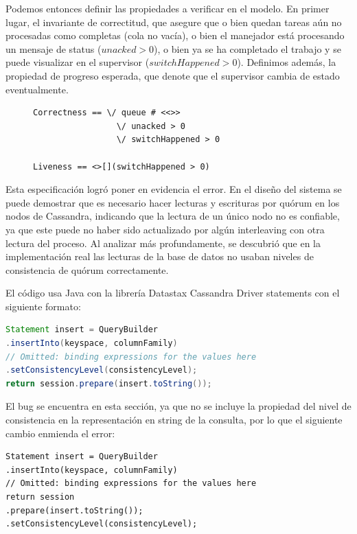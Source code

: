 \documentclass[runningheads]{llncs}
\begin{document}
Podemos entonces definir las propiedades a verificar en el modelo. En primer lugar, el invariante de correctitud, que asegure que o bien quedan tareas aún no procesadas como completas (cola no vacía), o bien el manejador está procesando un mensaje de status (\(unacked > 0\)), o bien ya se ha completado el trabajo y se puede visualizar en el supervisor (\(switchHappened > 0\)). Definimos además, la propiedad de progreso esperada, que denote que el supervisor cambia de estado eventualmente.

\begin{figure}
\begin{lstlisting}
Correctness == \/ queue # <<>>
                 \/ unacked > 0
                 \/ switchHappened > 0    

Liveness == <>[](switchHappened > 0)
\end{lstlisting}
\end{figure}

Esta especificación logró poner en evidencia el error. En el diseño del sistema se puede demostrar que es necesario hacer lecturas y escrituras por quórum en los nodos de Cassandra, indicando que la lectura de un único nodo no es confiable, ya que este puede no haber sido actualizado por algún interleaving con otra lectura del proceso. Al analizar más profundamente, se descubrió que en la implementación real las lecturas de la base de datos no usaban niveles de consistencia de quórum correctamente.

El código usa Java con la librería Datastax Cassandra Driver statements con el siguiente formato:
\begin{lstlisting}[language=Java]
Statement insert = QueryBuilder
.insertInto(keyspace, columnFamily)
// Omitted: binding expressions for the values here
.setConsistencyLevel(consistencyLevel);
return session.prepare(insert.toString());
\end{lstlisting}

El bug se encuentra en esta sección, ya que no se incluye la propiedad del nivel de consistencia en la representación en string de la consulta, por lo que el siguiente cambio enmienda el error:
%
\begin{lstlisting}
Statement insert = QueryBuilder
.insertInto(keyspace, columnFamily)
// Omitted: binding expressions for the values here
return session
.prepare(insert.toString());
.setConsistencyLevel(consistencyLevel);
\end{lstlisting}
\end{document}
